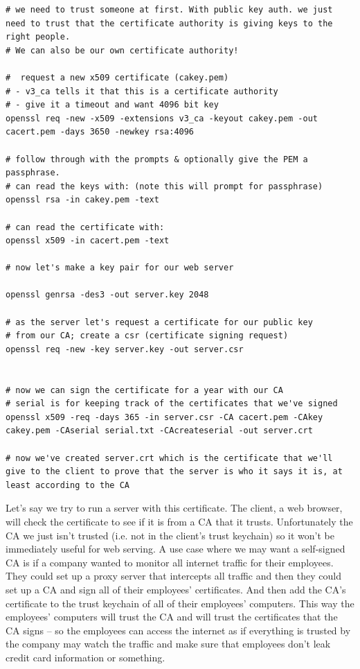 \documentclass[../notes.tex]{subfiles}
\begin{document}
\begin{listing}[H]
\begin{verbatim}
# we need to trust someone at first. With public key auth. we just need to trust that the certificate authority is giving keys to the right people.
# We can also be our own certificate authority!

#  request a new x509 certificate (cakey.pem)
# - v3_ca tells it that this is a certificate authority
# - give it a timeout and want 4096 bit key
openssl req -new -x509 -extensions v3_ca -keyout cakey.pem -out cacert.pem -days 3650 -newkey rsa:4096

# follow through with the prompts & optionally give the PEM a passphrase.
# can read the keys with: (note this will prompt for passphrase)
openssl rsa -in cakey.pem -text 

# can read the certificate with:
openssl x509 -in cacert.pem -text 

# now let's make a key pair for our web server

openssl genrsa -des3 -out server.key 2048

# as the server let's request a certificate for our public key
# from our CA; create a csr (certificate signing request)
openssl req -new -key server.key -out server.csr


# now we can sign the certificate for a year with our CA
# serial is for keeping track of the certificates that we've signed
openssl x509 -req -days 365 -in server.csr -CA cacert.pem -CAkey cakey.pem -CAserial serial.txt -CAcreateserial -out server.crt

# now we've created server.crt which is the certificate that we'll give to the client to prove that the server is who it says it is, at least according to the CA

\end{verbatim}
\end{listing}


Let's say we try to run a server with this certificate. The client, a web browser, will check the certificate to see if it is from a CA that it trusts. Unfortunately the CA we just isn't trusted (i.e. not in the client's trust keychain) so it won't be immediately useful for web serving.
A use case where we may want a self-signed CA is if a company wanted to monitor all internet traffic for their employees. They could set up a proxy server that intercepts all traffic and then they could set up a CA and sign all of their employees' certificates. 
And then add the CA's certificate to the trust keychain of all of their employees' computers. This way the employees' computers will trust the CA and will trust the certificates that the CA signs -- so the employees can access the internet as if everything is trusted by the company may watch the traffic and make sure that employees don't leak credit card information or something.
\end{document}
